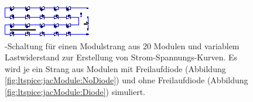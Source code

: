 \begin{figure}[h!tb]
    \centering
    \includegraphics[width=\textwidth]{images/ltspice/jac/stringNoD.eps}
    \caption[-Schaltung f\"ur Modulstrang]{%
        -Schaltung  f\"ur  einen   Modulstrang  aus  20  Modulen
        und   variablem  Lastwiderstand      zur  Erstellung   von
        Strom-Spannungs-Kurven. Es  wird   je  ein  Strang  aus   Modulen  mit
        Freilaufdiode   (Abbildung  \ref{fig:ltspice:jacModule:NoDiode})   und
        ohne   Freilaufdiode   (Abbildung   \ref{fig:ltspice:jacModule:Diode})
        simuliert.%
    }
    \label{fig:ltspice:string:ivCurve}
\end{figure}

